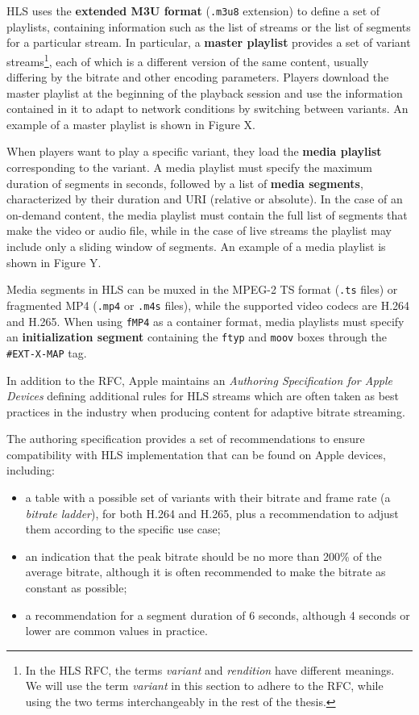 HLS uses the \textbf{extended M3U format} (\texttt{.m3u8} extension) to define a set of playlists, containing information such as the list of streams or the list of segments for a particular stream. In particular, a \textbf{master playlist} provides a set of variant streams\footnote{In the HLS RFC, the terms \textit{variant} and \textit{rendition} have different meanings. We will use the term \textit{variant} in this section to adhere to the RFC, while using the two terms interchangeably in the rest of the thesis.}, each of which is a different version of the same content, usually differing by the bitrate and other encoding parameters. Players download the master playlist at the beginning of the playback session and use the information contained in it to adapt to network conditions by switching between variants. An example of a master playlist is shown in Figure X.


When players want to play a specific variant, they load the \textbf{media playlist} corresponding to the variant. A media playlist must specify the maximum duration of segments in seconds, followed by a list of \textbf{media segments}, characterized by their duration and URI (relative or absolute). In the case of an on-demand content, the media playlist must contain the full list of segments that make the video or audio file, while in the case of live streams the playlist may include only a sliding window of segments. An example of a media playlist is shown in Figure Y.

Media segments in HLS can be muxed in the MPEG-2 TS format (\texttt{.ts} files) or fragmented MP4 (\texttt{.mp4} or \texttt{.m4s} files), while the supported video codecs are H.264 and H.265. When using \texttt{fMP4} as a container format, media playlists must specify an \textbf{initialization segment} containing the \texttt{ftyp} and \texttt{moov} boxes through the \texttt{\#EXT-X-MAP} tag.

In addition to the RFC, Apple maintains an \textit{Authoring Specification for Apple Devices} defining additional rules for HLS streams which are often taken as best practices in the industry when producing content for adaptive bitrate streaming.

The authoring specification provides a set of recommendations to ensure compatibility with HLS implementation that can be found on Apple devices, including:

\begin{itemize}
    \item a table with a possible set of variants with their bitrate and frame rate (a \textit{bitrate ladder}), for both H.264 and H.265, plus a recommendation to adjust them according to the specific use case;
    \item an indication that the peak bitrate should be no more than 200\% of the average bitrate, although it is often recommended to make the bitrate as constant as possible;\cite{ozer}
    \item a recommendation for a segment duration of 6 seconds, although 4 seconds or lower are common values in practice.\cite{ozer}
\end{itemize}

